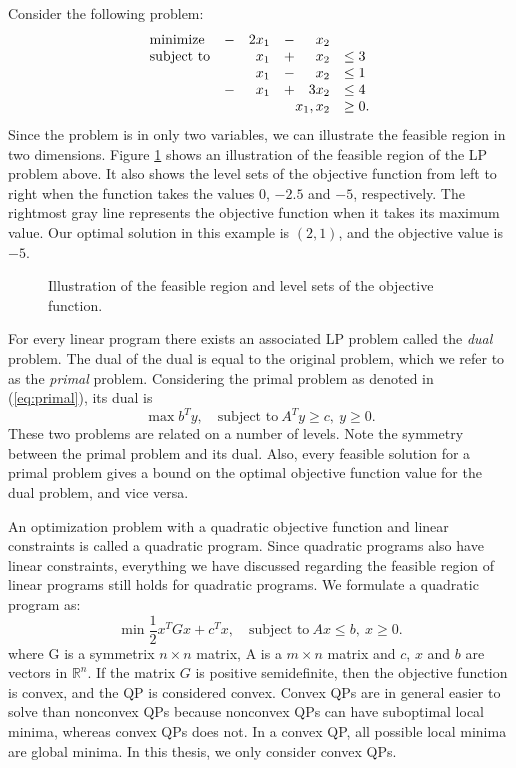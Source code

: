 Consider the following problem:
\[
\begin{array}{lcrcrl}
    \textrm{minimize}   &-& 2 x_1 &-&   x_2 \\
    \textrm{subject to} & &   x_1 &+&   x_2 & \leq 3 \\
                        & &   x_1 &-&   x_2 & \leq 1 \\
                        &-&   x_1 &+& 3 x_2 & \leq 4 \\
     \multicolumn{5}{r}{x_1,x_2}            & \geq 0.
\end{array}
\]
Since the problem is in only two variables, we can illustrate the feasible
region in two dimensions.
Figure \ref{fig:lpback} shows an illustration of the feasible
region of the LP problem above. It also shows the level sets of the objective
function from left to right when the function takes the values $0$, $-2.5$ and
$-5$, respectively.
The rightmost gray line represents the objective function when it takes
its maximum value. Our optimal solution in this example is $(2,1)$, and the
objective value is $-5$.

\begin{figure}[ht!]
\centering

\caption{Illustration of the feasible region and level sets of the objective
         function.}
\label{fig:lpback}
\end{figure}

For every linear program there exists an associated LP problem called
the \textit{dual} problem.
The dual of the dual is equal to the original problem, which we refer to as
the \textit{primal} problem.
Considering the primal problem as denoted in (\ref{eq:primal}), its dual is
\[
\max{b^T y},\quad \textrm{subject to}~A^T y \geq c, ~ y \geq 0.
\]
These two problems are related on a number of levels.
Note the symmetry between the primal problem and its dual.
Also, every feasible solution for a primal problem gives a bound on the optimal
objective function value for the dual problem, and vice
versa\cite{vanderbei,nocedal,boyd}.

An optimization problem with a quadratic objective function and linear
constraints is called a quadratic program. Since quadratic programs also have
linear constraints, everything we have discussed regarding the feasible region
of linear programs still holds for quadratic programs. We formulate a quadratic
program as:
\[
\min{\frac{1}{2}x^T G x + c^T x},\quad \textrm{subject to}~Ax \leq b, ~ x \geq 0.
\]
where G is a symmetrix $n \times n$ matrix, A is a $m \times n$ matrix
and $c$, $x$ and $b$ are vectors in $\mathbb{R}^n$. If the matrix $G$ is
positive semidefinite, then the objective function is convex, and the
QP is considered convex. Convex QPs are in general easier to solve than
nonconvex QPs because nonconvex QPs can have suboptimal local minima, whereas
convex QPs does not. In a convex QP, all possible local minima are global
minima. In this thesis, we only consider convex QPs.

